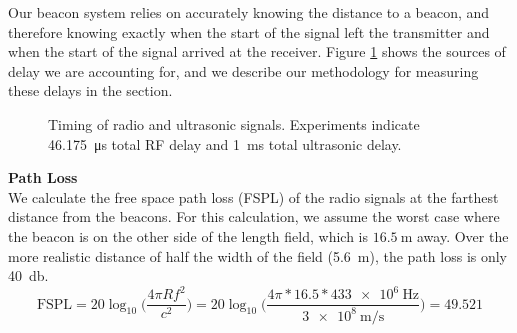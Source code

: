 \documentclass{article}
\begin{document}
        Our beacon system relies on accurately knowing the distance to a beacon, and therefore knowing exactly when the start of the signal left the transmitter and when the start of the signal arrived at the receiver. Figure \ref{fig:rx_tx_timing} shows the sources of delay we are accounting for, and we describe our methodology for measuring these delays in the  section. \\

      \begin{figure}
        \centering
        \label{fig:rx_tx_timing}
        \caption{Timing of radio and ultrasonic signals. Experiments indicate \SI{46.175}{\micro\second} total RF delay and \SI{1}{\milli\second} total ultrasonic delay.}
      \end{figure}

      \textbf{Path Loss} \\
      We calculate the free space path loss (FSPL) of the radio signals at the farthest distance from the beacons. For this calculation, we assume the worst case where the beacon is on the other side of the length field, which is $\SI{16.5}{\meter}$ away. Over the more realistic distance of half the width of the field (\SI{5.6}{\meter}), the path loss is only \SI{40}{\decibel}. \\
      $$ \text{FSPL} = 20\log_{10}\Bigg(\frac{4\pi Rf^2}{c^2}\Bigg) = 20\log_{10}\Bigg(\frac{4\pi*16.5*\SI{433e6}{\hertz}}{\SI{3e8}{\meter\per\second}}\Bigg) = 49.521 $$
\end{document}
